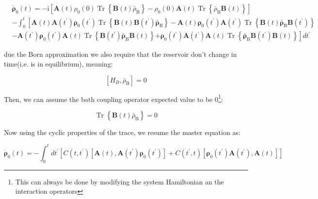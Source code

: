 \documentclass[%
preprint,
onecolumn,
notitlepag,
 amsmath,amssymb,
 aps,
 pra,
]{revtex4-2}
\begin{document}
\begin{equation}\begin{aligned}
& \dot{\boldsymbol{\rho}}_0(t)=-\mathrm{i} \left[\boldsymbol{A}(t) \rho_0(0) \operatorname{Tr}\left\{ \boldsymbol{B}(t) \bar{\rho}_{\mathrm{B}}\right\}-\rho_0(0) \boldsymbol{A}(t) \operatorname{Tr}\left\{\bar{\rho}_{\mathrm{B}} \boldsymbol{B}(t)\right\}\right] \\
&- \int_{0}^{t}\left[\boldsymbol{A}(t)  \boldsymbol{A}\left(t^{\prime}\right) \boldsymbol{\rho_{\mathrm{0}}}\left(t^{\prime}\right) \operatorname{Tr}\left\{\boldsymbol{B}(t) \boldsymbol{B}\left(t^{\prime}\right) \bar{\boldsymbol{\rho}}_{\mathrm{B}}\right\}\right. -\boldsymbol{A}(t) \boldsymbol{\rho}_{\mathrm{0}}\left(t^{\prime}\right) \boldsymbol{A} \left(t^{\prime}\right) \operatorname{Tr}\left\{\boldsymbol{B}(t) \bar{\boldsymbol{\rho}}_{\mathrm{B}} \boldsymbol{B}\left(t^{\prime}\right)\right\} \\
& -\boldsymbol{A}\left(t^{\prime}\right) \boldsymbol{\rho}_{\mathrm{0}}\left(t^{\prime}\right) \boldsymbol{A}(t) \operatorname{Tr}\left\{\boldsymbol{B}\left(t^{\prime}\right) \bar{\boldsymbol{\rho}}_{\mathrm{B}} \boldsymbol{B}(t)\right\} 
\left.+\boldsymbol{\rho}_{\mathrm{0}}\left(t^{\prime}\right) \boldsymbol{A}\left(t^{\prime}\right) \boldsymbol{A}(t) \operatorname{Tr}\left\{\bar{\boldsymbol{\rho}}_{\mathrm{B}} \boldsymbol{B}\left(t^{\prime}\right) \boldsymbol{B}(t)\right\}\right] d t^{\prime}
\end{aligned}\end{equation}

due the Born approximation we also require that the reservoir don't change in time(i.e. is in equilibrium), meaning: 

\begin{equation}\left[H_{B}, \bar{\rho}_{\mathrm{B}}\right]=0\end{equation}

Then, we can assume the bath coupling operator expected value to be 0\footnote{This can always be done by modifying the system Hamiltonian an the interaction operators}:

\begin{equation}\operatorname{Tr}\left\{\boldsymbol{B}(t) \bar{\rho}_{\mathrm{B}}\right\}=0\end{equation}


Now using the cyclic properties of the trace, we resume the master equation as: 

\begin{equation}
\dot{\boldsymbol{\rho}}_0(t)=- \int_{0}^{t} d t^{\prime}\left[C\left(t, t^{\prime}\right)\left[\boldsymbol{A}(t), \boldsymbol{A}\left(t^{\prime}\right) \boldsymbol{\rho}_{\mathrm{0}}\left(t^{\prime}\right)\right]+C\left(t^{\prime}, t\right)\left[\boldsymbol{\rho}_{\mathrm{0}}\left(t^{\prime}\right) \boldsymbol{A}\left(t^{\prime}\right), \boldsymbol{A}(t)\right]\right]\end{equation}\label{Non_markovian_eq}
\end{document}
